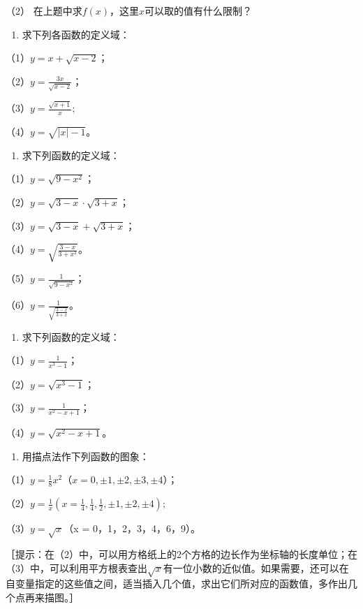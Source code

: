 （2） 在上题中求\(f(x)\)，这里\(x\)可以取的值有什么限制？

\begin{enumerate}[start=4]
\item
  求下列各函数的定义域：
\end{enumerate}

（1）\(y = x + \sqrt{x - 2}\)；

（2）\(y = \frac{3x}{\sqrt{x - 2}}\)；

（3）\(y = \frac{\sqrt{x + 1}}{x};\)

（4）\(y = \sqrt{|x| - 1}\)。

\begin{enumerate}[start=5]
\item
  求下列函数的定义域：
\end{enumerate}

（1）\(y = \sqrt{9 - x^2}\)；

（2）\(y = \sqrt{3 - x} \cdot \sqrt{3 + x}\)；

（3）\(y = \sqrt{3 - x} + \sqrt{3 + x}\)；

（4）\(y = \sqrt{\frac{3 - x}{3 + x^2}}\)。

（5）\(y = \frac{1}{\sqrt{9 - x^2}}\)；

（6）\(y = \frac{1}{\sqrt{\frac{3 - x}{3 + x}}}\)。

\begin{enumerate}[start=6]
\item
  求下列函数的定义域：
\end{enumerate}

（1）\(y = \frac{1}{x^3 - 1}\)；

（2）\(y = \sqrt{x^3 - 1}\)；

（3）\(y = \frac{1}{x^2 - x + 1}\)；

（4）\(y = \sqrt{x^2 - x + 1}\)。

\begin{enumerate}[start=7]
\item
  用描点法作下列函数的图象：
\end{enumerate}

（1）\(y=\frac18x^2\)（\(x = 0, \pm 1, \pm 2, \pm 3, \pm 4\)）；

（2）\(y = \frac{1}{x} \left( x = \frac{1}{4}, \frac{1}{4}, \frac{1}{2}, \pm 1, \pm 2, \pm 4 \right);\)

（3）\(y = \sqrt{x}\)（x = 0，1，2，3，4，6，9）。

［提示：在（2）中，可以用方格纸上的2个方格的边长作为坐标轴的长度单位；在（3）中，可以利用平方根表查出\(\sqrt{x}\)有一位小数的近似值。如果需要，还可以在自变量指定的这些值之间，适当插入几个值，求出它们所对应的函数值，多作出几个点再来描图。］

